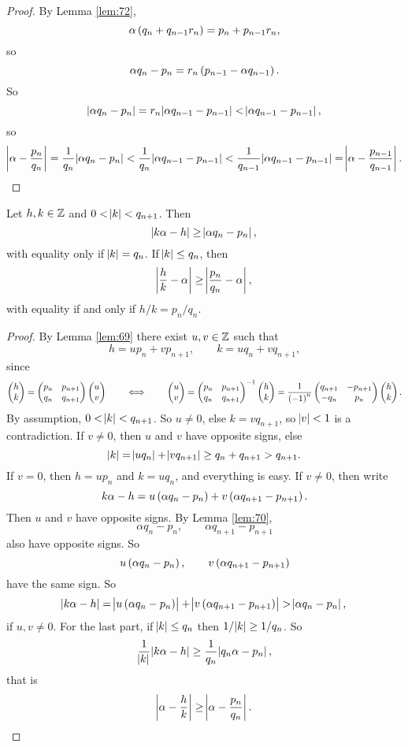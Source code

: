 \begin{proof}
By Lemma \ref{lem:72},
$$ \alpha\br{q_n + q_{n - 1}r_n} = p_n + p_{n - 1}r_n, $$
so
$$ \alpha q_n - p_n = r_n\br{p_{n - 1} - \alpha q_{n - 1}}. $$
So
$$ \abs{\alpha q_n - p_n} = r_n\abs{\alpha q_{n - 1} - p_{n - 1}} < \abs{\alpha q_{n - 1} - p_{n - 1}}, $$
so
$$ \abs{\alpha - \dfrac{p_n}{q_n}} = \dfrac{1}{q_n}\abs{\alpha q_n - p_n} < \dfrac{1}{q_n}\abs{\alpha q_{n - 1} - p_{n - 1}} < \dfrac{1}{q_{n - 1}}\abs{\alpha q_{n - 1} - p_{n - 1}} = \abs{\alpha - \dfrac{p_{n - 1}}{q_{n - 1}}}. $$
\end{proof}

\begin{theorem}
\label{thm:74}
Let $ h, k \in \mathbb{Z} $ and $ 0 < \abs{k} < q_{n + 1} $. Then
$$ \abs{k\alpha - h} \ge \abs{\alpha q_n - p_n}, $$
with equality only if $ \abs{k} = q_n $. If $ \abs{k} \le q_n $, then
$$ \abs{\dfrac{h}{k} - \alpha} \ge \abs{\dfrac{p_n}{q_n} - \alpha}, $$
with equality if and only if $ h / k = p_n / q_n $.
\end{theorem}

\pagebreak

\begin{proof}
By Lemma \ref{lem:69} there exist $ u, v \in \mathbb{Z} $ such that
$$ h = up_n + vp_{n + 1}, \qquad k = uq_n + vq_{n + 1}, $$
since
$$ \twobyone{h}{k} = \twobytwo{p_n}{p_{n + 1}}{q_n}{q_{n + 1}}\twobyone{u}{v} \qquad \iff \qquad \twobyone{u}{v} = \twobytwo{p_n}{p_{n + 1}}{q_n}{q_{n + 1}}^{-1}\twobyone{h}{k} = \dfrac{1}{\br{-1}^n}\twobytwo{q_{n + 1}}{-p_{n + 1}}{-q_n}{p_n}\twobyone{h}{k}. $$
By assumption, $ 0 < \abs{k} < q_{n + 1} $. So $ u \ne 0 $, else $ k = vq_{n + 1} $, so $ \abs{v} < 1 $ is a contradiction. If $ v \ne 0 $, then $ u $ and $ v $ have opposite signs, else
$$ \abs{k} = \abs{uq_n} + \abs{vq_{n + 1}} \ge q_n + q_{n + 1} > q_{n + 1}. $$
If $ v = 0 $, then $ h = up_n $ and $ k = uq_n $, and everything is easy. If $ v \ne 0 $, then write
$$ k\alpha - h = u\br{\alpha q_n - p_n} + v\br{\alpha q_{n + 1} - p_{n + 1}}. $$
Then $ u $ and $ v $ have opposite signs. By Lemma \ref{lem:70},
$$ \alpha q_n - p_n, \qquad \alpha q_{n + 1} - p_{n + 1} $$
also have opposite signs. So
$$ u\br{\alpha q_n - p_n}, \qquad v\br{\alpha q_{n + 1} - p_{n + 1}} $$
have the same sign. So
$$ \abs{k\alpha - h} = \abs{u\br{\alpha q_n - p_n}} + \abs{v\br{\alpha q_{n + 1} - p_{n + 1}}} > \abs{\alpha q_n - p_n}, $$
if $ u, v \ne 0 $. For the last part, if $ \abs{k} \le q_n $ then $ 1 / \abs{k} \ge 1 / q_n $. So
$$ \dfrac{1}{\abs{k}}\abs{k\alpha - h} \ge \dfrac{1}{q_n}\abs{q_n\alpha - p_n}, $$
that is
$$ \abs{\alpha - \dfrac{h}{k}} \ge \abs{\alpha - \dfrac{p_n}{q_n}}. $$
\end{proof}

